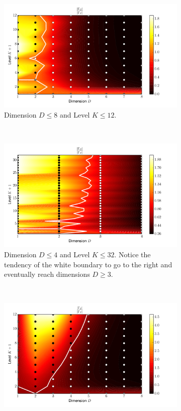 \documentclass[a4paper,10pt]{article}
\begin{document}
\begin{figure}
  \begin{subfigure}[b]{\linewidth}
    \centering
    \includegraphics[width=0.8\linewidth]{./img/gk_legendre_ratio.pdf}
    \caption{Dimension $D \leq 8$ and Level $K \leq 12$.}
    \label{fig:gk_legendre_ratio}
  \end{subfigure} \\
  \begin{subfigure}[b]{\linewidth}
    \centering
    \includegraphics[width=0.8\linewidth]{./img/gk_legendre_ratio_large.pdf}
    \caption{Dimension $D \leq 4$ and Level $K \leq 32$. Notice the tendency
    of the white boundary to go to the right and eventually reach dimensions $D \geq 3$.}
    \label{fig:gk_legendre_ratio_large}
  \end{subfigure} \\
  \begin{subfigure}[b]{\linewidth}
    \centering
    \includegraphics[width=0.8\linewidth]{./img/smol_legendre_ratio.pdf}

\end{subfigure}
\end{figure}
\end{document}
